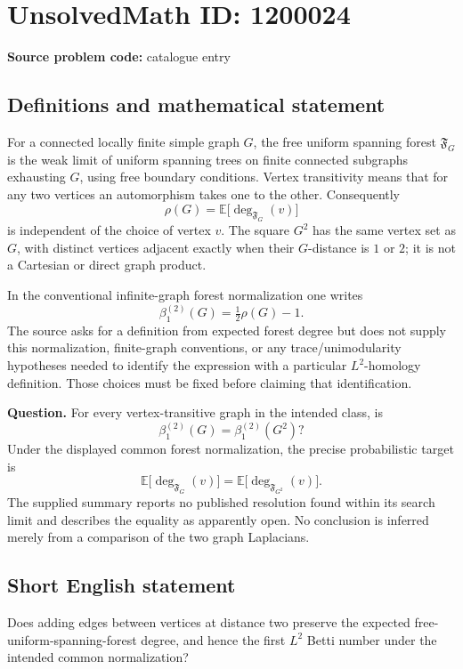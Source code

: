 \documentclass[11pt]{article}
\begin{document}
\section*{UnsolvedMath ID: 1200024}
\textbf{Source problem code:} catalogue entry
\subsection{Definitions and mathematical statement}
For a connected locally finite simple graph $G$, the free uniform spanning forest $\mathfrak F_G$ is the weak limit of uniform spanning trees on finite connected subgraphs exhausting $G$, using free boundary conditions. Vertex transitivity means that for any two vertices an automorphism takes one to the other. Consequently
\[
\rho(G)=\mathbb E\big[\deg_{\mathfrak F_G}(v)\big]
\]
is independent of the choice of vertex $v$. The square $G^2$ has the same vertex set as $G$, with distinct vertices adjacent exactly when their $G$-distance is $1$ or $2$; it is not a Cartesian or direct graph product.

In the conventional infinite-graph forest normalization one writes
\[
\beta_1^{(2)}(G)=\tfrac12\rho(G)-1.
\]
The source asks for a definition from expected forest degree but does not supply this normalization, finite-graph conventions, or any trace/unimodularity hypotheses needed to identify the expression with a particular $L^2$-homology definition. Those choices must be fixed before claiming that identification.

\textbf{Question.} For every vertex-transitive graph in the intended class, is
\[
\beta_1^{(2)}(G)=\beta_1^{(2)}(G^2)?
\]
Under the displayed common forest normalization, the precise probabilistic target is
\[
\mathbb E\big[\deg_{\mathfrak F_G}(v)\big]
=\mathbb E\big[\deg_{\mathfrak F_{G^2}}(v)\big].
\]
The supplied summary reports no published resolution found within its search limit and describes the equality as apparently open. No conclusion is inferred merely from a comparison of the two graph Laplacians.
\subsection{Short English statement}
Does adding edges between vertices at distance two preserve the expected free-uniform-spanning-forest degree, and hence the first $L^2$ Betti number under the intended common normalization?
\end{document}
